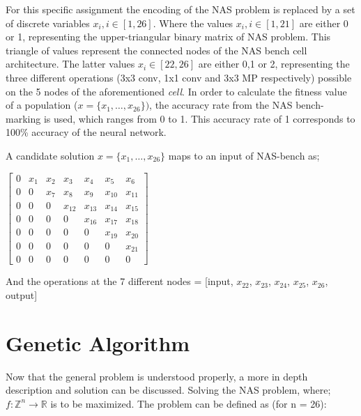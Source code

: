 \documentclass{article}
\begin{document}
For this specific assignment the encoding of the NAS problem is replaced by a set of discrete variables $x_i, i \in [1, 26]$.
Where the values $x_i, i \in [1, 21]$ are either 0 or 1, representing the upper-triangular binary matrix of NAS problem.
This triangle of values represent the connected nodes of the NAS bench cell architecture.
The latter values $x_i \in [22,26]$ are either 0,1 or 2, representing the three different operations (3x3 conv, 1x1 conv and 3x3 MP respectively) possible on the 5 nodes of the aforementioned \textit{cell}.
In order to calculate the fitness value of a population ($x = \{x_1, \dots, x_26\})$, the accuracy rate from the NAS bench-marking is used, which ranges from 0 to 1.
This accuracy rate of 1 corresponds to 100\% accuracy of the neural network.

A candidate solution $x = \{x_1, \dots , x_{26}\}$ maps to an input of NAS-bench as; 

$ \begin{bmatrix}
0 & x_1 & x_2 & x_3    & x_4    & x_5    & x_6    \\
0 & 0   & x_7 & x_8    & x_9    & x_{10} & x_{11} \\
0 & 0   & 0   & x_{12} & x_{13} & x_{14} & x_{15} \\
0 & 0   & 0   & 0      & x_{16} & x_{17} & x_{18} \\
0 & 0   & 0   & 0      & 0      & x_{19} & x_{20} \\
0 & 0   & 0   & 0      & 0      & 0      & x_{21} \\
0 & 0   & 0   & 0      & 0      & 0      & 0 
\end{bmatrix}  $

And the operations at the 7 different nodes = [input, $x_{22}$, $x_{23}$, $x_{24}$, $x_{25}$, $x_{26}$, output]



\section{Genetic Algorithm}
\label{sec:GA}

Now that the general problem is understood properly, a more in depth description and solution can be discussed. Solving the NAS problem, where; $f: \mathbb{Z}^n \rightarrow \mathbb{R}$ is to be maximized. The problem can be defined as (for n = 26):
\end{document}
